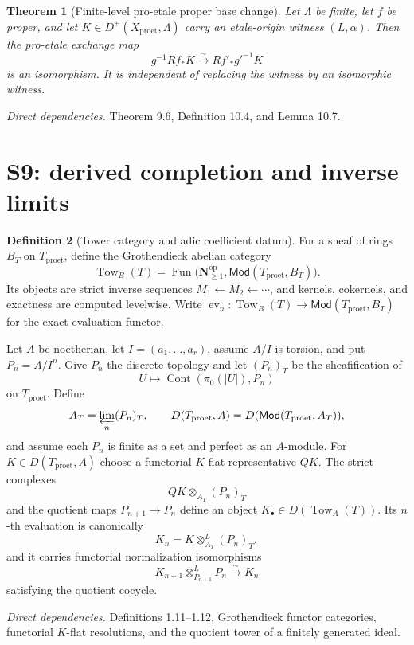 \documentclass[10pt]{article}
\newtheorem{theorem}{Theorem}[section]
\theoremstyle{definition}
\newtheorem{definition}[theorem]{Definition}
\newcommand{\Mod}{\mathsf{Mod}}
\newcommand{\Dplus}{D^+}
\newcommand{\Proet}{\mathrm{proet}}
\newcommand{\deps}[1]{\par\smallskip\textit{Direct dependencies.} #1\par}
\begin{document}
\begin{theorem}[Finite-level pro-etale proper base change]
Let $\Lambda$ be finite, let $f$ be proper, and let
$K\in\Dplus(X_{\Proet},\Lambda)$ carry an etale-origin witness
$(L,\alpha)$.  Then the pro-etale exchange map
\[
 g^{-1}Rf_*K\xrightarrow{\sim}Rf'_*g'^{-1}K
\]
is an isomorphism.  It is independent of replacing the witness by an
isomorphic witness.
\end{theorem}
\deps{Theorem 9.6, Definition 10.4, and Lemma 10.7.}

\section{S9: derived completion and inverse limits}

\begin{definition}[Tower category and adic coefficient datum]
For a sheaf of rings $B_T$ on $T_{\Proet}$, define the Grothendieck abelian
category
\[
 \operatorname{Tow}_{B}(T)=
 \operatorname{Fun}\bigl(\mathbf N_{\geq1}^{\mathrm{op}},
              \Mod(T_{\Proet},B_T)\bigr).
\]
Its objects are strict inverse sequences
$M_1\leftarrow M_2\leftarrow\cdots$, and kernels, cokernels, and exactness
are computed levelwise.  Write
$\operatorname{ev}_n:\operatorname{Tow}_{B}(T)\to
\Mod(T_{\Proet},B_T)$ for the exact evaluation functor.

Let $A$ be noetherian, let $I=(a_1,\dots,a_r)$, assume $A/I$ is torsion,
and put $P_n=A/I^n$.  Give $P_n$ the discrete topology and let
$(P_n)_T$ be the sheafification of
\[
 U\longmapsto\operatorname{Cont}(\pi_0(|U|),P_n)
\]
on $T_{\Proet}$.  Define
\[
 A_T=\varprojlim_n(P_n)_T,
 \qquad
 D(T_{\Proet},A)=D(\Mod(T_{\Proet},A_T)),
\]
and assume each $P_n$ is finite as a set and perfect as an $A$-module.  For
$K\in D(T_{\Proet},A)$ choose a functorial $K$-flat representative
$QK$.  The strict complexes
\[
 QK\otimes_{A_T}(P_n)_T
\]
and the quotient maps $P_{n+1}\to P_n$ define an object
$K_\bullet\in D(\operatorname{Tow}_{A}(T))$.  Its $n$-th evaluation is
canonically
\[
 K_n=K\otimes^L_{A_T}(P_n)_T,
\]
and it carries functorial normalization isomorphisms
\[
 K_{n+1}\otimes^L_{P_{n+1}}P_n\xrightarrow{\sim}K_n
\]
satisfying the quotient cocycle.
\end{definition}
\deps{Definitions 1.11--1.12, Grothendieck functor categories,
functorial $K$-flat resolutions, and the quotient tower of a finitely
generated ideal.}
\end{document}
